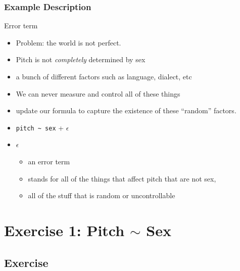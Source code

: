 \documentclass[10p]{beamer}\usepackage[]{graphicx}\usepackage[]{color}
\begin{document}
\begin{frame}[fragile]
\frametitle{Example Description}
Error term
\begin{itemize}
\item Problem: the world is not perfect.
\item Pitch is not \textit{completely} determined by sex
\item a bunch of different factors such as language, dialect, etc
\item We can never measure and control all of these things
\item update our formula to capture the existence of these ``random'' factors.
\item \verb|pitch ~ sex| + $\epsilon$ 
\item $\epsilon$
	\begin{itemize}
	\item an error term
	\item stands for all of the things that affect pitch that are not sex,
	\item all of the stuff that is random or uncontrollable
	\end{itemize}
\end{itemize}

\end{frame}

\section[Exercise1]{Exercise 1: Pitch $\sim$ Sex}
\subsection{Exercise}
\end{document}
